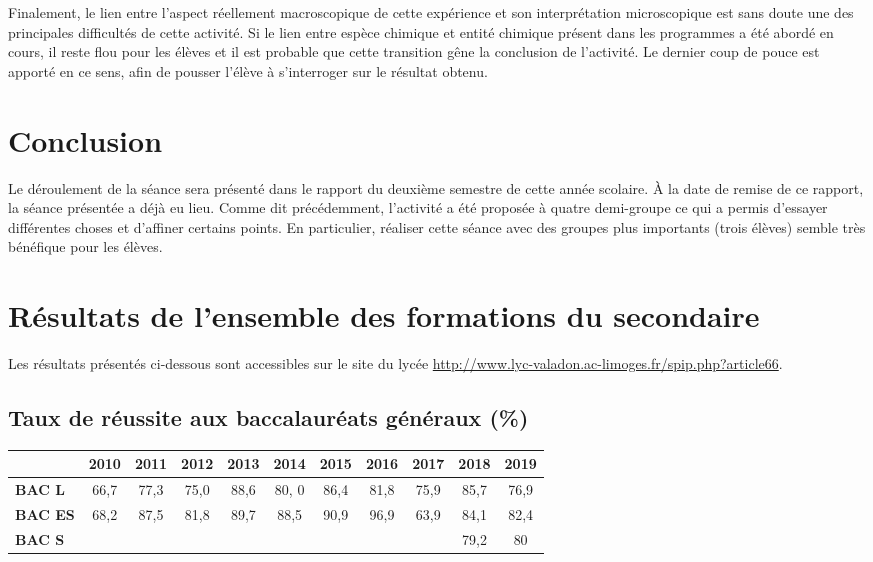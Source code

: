 \documentclass[12pt,a4paper]{article}
\begin{document}
Finalement, le lien entre l'aspect réellement macroscopique de cette expérience et son interprétation microscopique est sans doute une des principales difficultés de cette activité.
Si le lien entre espèce chimique et entité chimique présent dans les programmes a été abordé en cours, il reste flou pour les élèves et il est probable que cette transition gêne la conclusion de l'activité.
Le dernier coup de pouce est apporté en ce sens, afin de pousser l'élève à s'interroger sur le résultat obtenu.

\section*{Conclusion}

Le déroulement de la séance sera présenté dans le rapport du deuxième semestre de cette année scolaire.
À la date de remise de ce rapport, la séance présentée a déjà eu lieu.
Comme dit précédemment, l'activité a été proposée à quatre demi-groupe ce qui a permis d'essayer différentes choses et d'affiner certains points.
En particulier, réaliser cette séance avec des groupes plus importants (trois élèves) semble très bénéfique pour les élèves.

\newpage


\newpage
\appendix

\section{Résultats de l'ensemble des formations du secondaire}
\label{ann:resultats}

Les résultats présentés ci-dessous sont accessibles sur le site du lycée \href{http://www.lyc-valadon.ac-limoges.fr/spip.php?article66}{http://www.lyc-valadon.ac-limoges.fr/spip.php?article66}.

\subsection{Taux de réussite aux baccalauréats généraux (\%)}

\begin{center}
\begin{tabular}{l|c|c|c|c|c|c|c|c|c|c}
		& \textbf{2010} & \textbf{2011} & \textbf{2012} & \textbf{2013} & \textbf{2014} & \textbf{2015} & \textbf{2016} & \textbf{2017} & \textbf{2018} & \textbf{2019} \\
\hline \hline
\textbf{BAC L} 		& 66{,}7 & 77{,}3 & 75{,}0 & 88{,}6 & 80{,} 0 & 86{,}4 & 81{,}8 & 75{,}9 & 85{,}7 & 76{,}9 \\
\hline
\textbf{BAC ES} 	& 68{,}2 & 87{,}5 & 81{,}8 & 89{,}7 & 88{,}5 & 90{,}9 & 96{,}9 & 63{,}9 & 84{,}1 & 82{,}4 \\
\hline
\textbf{BAC S}		& & & & & & & & & 79{,}2 & 80 \\
\end{tabular}
\end{center}
\end{document}
